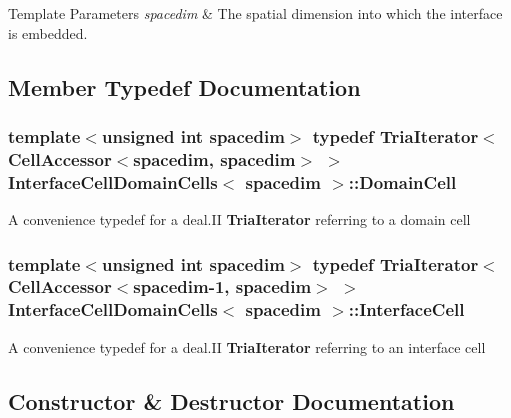 \begin{DoxyTemplParams}{Template Parameters}
{\em spacedim} & The spatial dimension into which the interface is embedded. \\
\hline
\end{DoxyTemplParams}


\subsection{Member Typedef Documentation}
\subsubsection[{\texorpdfstring{Domain\+Cell}{DomainCell}}]{\setlength{\rightskip}{0pt plus 5cm}template$<$unsigned int spacedim$>$ typedef {\bf Tria\+Iterator}$<${\bf Cell\+Accessor}$<$spacedim, spacedim$>$ $>$ {\bf Interface\+Cell\+Domain\+Cells}$<$ spacedim $>$\+::{\bf Domain\+Cell}}\hypertarget{class_interface_cell_domain_cells_aea8f8f65d0f5021da9c5b8e147b6d587}{}\label{class_interface_cell_domain_cells_aea8f8f65d0f5021da9c5b8e147b6d587}
A convenience typedef for a deal.\+II {\bf Tria\+Iterator} referring to a domain cell 
\subsubsection[{\texorpdfstring{Interface\+Cell}{InterfaceCell}}]{\setlength{\rightskip}{0pt plus 5cm}template$<$unsigned int spacedim$>$ typedef {\bf Tria\+Iterator}$<${\bf Cell\+Accessor}$<$spacedim-\/1, spacedim$>$ $>$ {\bf Interface\+Cell\+Domain\+Cells}$<$ spacedim $>$\+::{\bf Interface\+Cell}}\hypertarget{class_interface_cell_domain_cells_ac6c8ada1cde14364575ef0191a278bf8}{}\label{class_interface_cell_domain_cells_ac6c8ada1cde14364575ef0191a278bf8}
A convenience typedef for a deal.\+II {\bf Tria\+Iterator} referring to an interface cell 

\subsection{Constructor \& Destructor Documentation}

